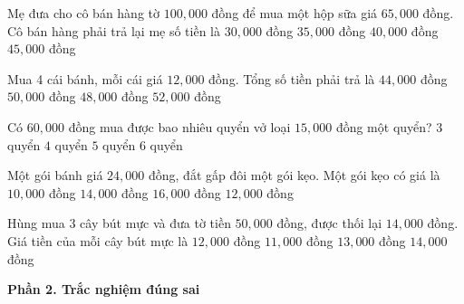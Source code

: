\begin{ex} %
Mẹ đưa cho cô bán hàng tờ $100,000$ đồng để mua một hộp sữa giá $65,000$ đồng. Cô bán hàng phải trả lại mẹ số tiền là
\choice
{$30,000$ đồng}
{\True $35,000$ đồng}
{$40,000$ đồng}
{$45,000$ đồng}
\end{ex}

\begin{ex} %
Mua 4 cái bánh, mỗi cái giá $12,000$ đồng. Tổng số tiền phải trả là
\choice
{$44,000$ đồng}
{$50,000$ đồng}
{\True $48,000$ đồng}
{$52,000$ đồng}
\end{ex}

\begin{ex} %
Có $60,000$ đồng mua được bao nhiêu quyển vở loại $15,000$ đồng một quyển?
\choice
{$3$ quyển}
{\True $4$ quyển}
{$5$ quyển}
{$6$ quyển}
\end{ex}

\begin{ex} %
Một gói bánh giá $24,000$ đồng, đắt gấp đôi một gói kẹo. Một gói kẹo có giá là
\choice
{$10,000$ đồng}
{$14,000$ đồng}
{$16,000$ đồng}
{\True $12,000$ đồng}
\end{ex}

\begin{ex} %
Hùng mua 3 cây bút mực và đưa tờ tiền $50,000$ đồng, được thối lại $14,000$ đồng. Giá tiền của mỗi cây bút mực là
\choice
{\True $12,000$ đồng}
{$11,000$ đồng}
{$13,000$ đồng}
{$14,000$ đồng}
\end{ex}

\textbf{Phần 2. Trắc nghiệm đúng sai}

